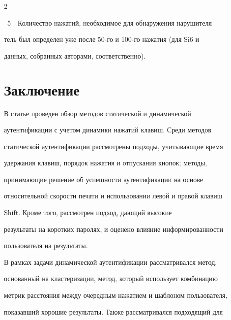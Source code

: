 \begin{multicols}{2}
\begin{center}
{ }

 \end{center}

 \vspace*{3pt}

{{\figurename~5}\ \ \small{Количество нажатий, необходимое для обнаружения нарушителя}}




\vspace*{12pt}



\noindent

тель был определен уже после 50-го и 100-го нажатия (для Si6 и

данных, собранных авторами, соответственно).



\vspace*{-2pt}



\section{Заключение}



В статье проведен обзор методов статической и динамической

аутентификации с учетом динамики нажатий клавиш. Среди методов

статической аутентификации рассмотрены подходы, учитывающие время

удержания клавиш, порядок нажатия и отпускания кнопок; методы,

принимающие решение об успешности аутентификации на основе

относительной скорости печати и использовании левой и правой клавиш

{\sf Shift}. Кроме того, рассмотрен подход, дающий высокие

результаты на коротких паролях, и оценено влияние информированности

пользователя на результаты.



В рамках задачи динамической аутентификации рассматривался метод,

основанный на кластеризации, метод, который использует комбинацию

метрик расстояния между очередным нажатием и шаблоном пользователя,

показавший хорошие результаты. Также рассматривался подходящий для


\end{multicols}
